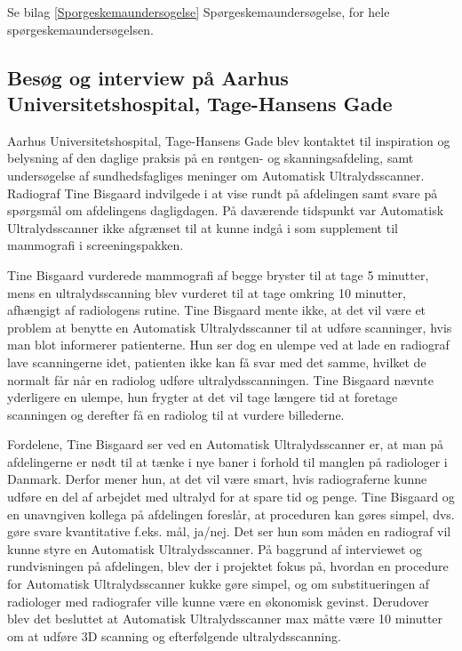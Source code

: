 Se bilag \ref{Sporgeskemaundersogelse} Spørgeskemaundersøgelse, for hele spørgeskemaundersøgelsen. 

\subsection{Besøg og interview på Aarhus Universitetshospital, Tage-Hansens Gade} 
Aarhus Universitetshospital, Tage-Hansens Gade blev kontaktet til inspiration og belysning af den daglige praksis på en røntgen- og skanningsafdeling, samt undersøgelse af sundhedsfagliges meninger om Automatisk Ultralydsscanner. Radiograf Tine Bisgaard indvilgede i at vise rundt på afdelingen samt svare på spørgsmål om afdelingens dagligdagen. På daværende tidspunkt var Automatisk Ultralydsscanner ikke afgrænset til at kunne indgå i som supplement til mammografi i screeningspakken. 

Tine Bisgaard vurderede mammografi af begge bryster til at tage 5 minutter, mens en ultralydsscanning blev vurderet til at tage omkring 10 minutter, afhængigt af radiologens rutine. Tine Bisgaard mente ikke, at det vil være et problem at benytte en Automatisk Ultralydsscanner til at udføre scanninger, hvis man blot informerer patienterne. Hun ser dog en ulempe ved at lade en radiograf lave scanningerne idet, patienten ikke kan få svar med det samme, hvilket de normalt får når en radiolog udføre ultralydsscanningen. Tine Bisgaard nævnte yderligere en ulempe, hun frygter at det vil tage længere tid at foretage scanningen og derefter få en radiolog til at vurdere billederne.

Fordelene, Tine Bisgaard ser ved en Automatisk Ultralydsscanner er, at man på afdelingerne er nødt til at tænke i nye baner i forhold til manglen på radiologer i Danmark. Derfor mener hun, at det vil være smart, hvis radiograferne kunne udføre en del af arbejdet med ultralyd for at spare tid og penge. Tine Bisgaard og en unavngiven kollega på afdelingen foreslår, at proceduren kan gøres simpel, dvs. gøre svare kvantitative f.eks. mål, ja/nej. Det ser hun som måden en radiograf vil kunne styre en Automatisk Ultralydsscanner. På baggrund af interviewet og rundvisningen på afdelingen, blev der i projektet fokus på, hvordan en procedure for Automatisk Ultralydsscanner kukke gøre simpel, og om substitueringen af radiologer med radiografer ville kunne være en økonomisk gevinst. Derudover blev det besluttet at Automatisk Ultralydsscanner max måtte være 10 minutter om at udføre 3D scanning og efterfølgende ultralydsscanning. 

